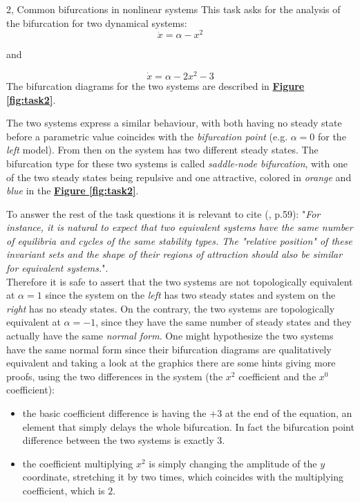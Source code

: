 \documentclass[10pt,a4paper]{article}
\begin{document}
\begin{task}{2, Common bifurcations in nonlinear systems}
This task asks for the analysis of the bifurcation for two dynamical systems: $$\dot x = \alpha - x^2$$ 
\begin{center}
    and
\end{center} $$\dot x = \alpha - 2x^2 - 3$$
The bifurcation diagrams for the two systems are described in \textbf{\hyperref[fig:task2]{Figure \ref{fig:task2}}}.


The two systems express a similar behaviour, with both having no steady state before a parametric value coincides with the \textit{bifurcation point} (e.g. $\alpha=0$ for the \textit{left} model). From then on the system has two different steady states. The bifurcation type for these two systems is called \textit{saddle-node bifurcation}, with one of the two steady states being repulsive and one attractive, colored in \textit{orange} and \textit{blue} in the \textbf{\hyperref[fig:task2]{Figure \ref{fig:task2}}}.

To answer the rest of the task questions it is relevant to cite (\cite{kuznetsov}, p.59): "\textit{For instance, it is natural to expect that two equivalent systems have the 
same number of equilibria and cycles of the same stability types. The "relative 
position" of these invariant sets and the shape of their regions of attraction 
should also be similar for equivalent systems.}".\\
Therefore it is safe to assert that the two systems are not topologically equivalent at $\alpha=1$ since the system on the \textit{left} has two steady states and system on the \textit{right} has no steady states. On the contrary, the two systems are topologically equivalent at $\alpha=-1$, since they have the same number of steady states and they actually have the same \textit{normal form}. One might hypothesize the two systems have the same normal form since their bifurcation diagrams are qualitatively equivalent and taking a look at the graphics there are some hints giving more proofs, using the two differences in the system (the $x^2$ coefficient and the $x^0$ coefficient):
\begin{itemize}
    \item the basic coefficient difference is having the $+3$ at the end of the equation, an element that simply delays the whole bifurcation. In fact the bifurcation point difference between the two systems is exactly $3$.
    \item the coefficient multiplying $x^2$ is simply changing the amplitude of the $y$ coordinate, stretching it by two times, which coincides with the multiplying coefficient, which is $2$.
\end{itemize}


\end{task}
\end{document}
